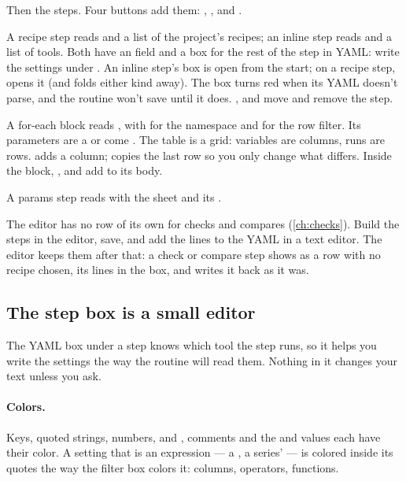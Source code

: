 Then the steps. Four buttons add them: , ,  and .

A recipe step reads  and a list of the project's recipes; an inline step reads  and a list of tools. Both have an  field and a box for the rest of the step in YAML: write the settings under . An inline step's box is open from the start; on a recipe step,  opens it (and folds either kind away). The box turns red when its YAML doesn't parse, and the routine won't save until it does. ,  and  move and remove the step.

A for-each block reads , with  for the namespace and  for the row filter. Its parameters are a  or come . The table is a grid: variables are columns, runs are rows.  adds a column;  copies the last row so you only change what differs. Inside the block, ,  and  add to its body.

A params step reads  with the sheet and its .

\begin{note}
The editor has no row of its own for checks and compares (\cref{ch:checks}). Build the steps in the editor, save, and add the  lines to the YAML in a text editor. The editor keeps them after that: a check or compare step shows as a  row with no recipe chosen, its lines in the  box, and  writes it back as it was.
\end{note}

\subsection{The step box is a small editor}\label{sec:routines-stepbox}
The YAML box under a step knows which tool the step runs, so it helps you write the settings the way the routine will read them. Nothing in it changes your text unless you ask.

\paragraph{Colors.} Keys, quoted strings, numbers,  and , comments and the  and  values each have their color. A setting that is an expression — a , a series'  — is colored inside its quotes the way the filter box colors it: columns, operators, functions.

